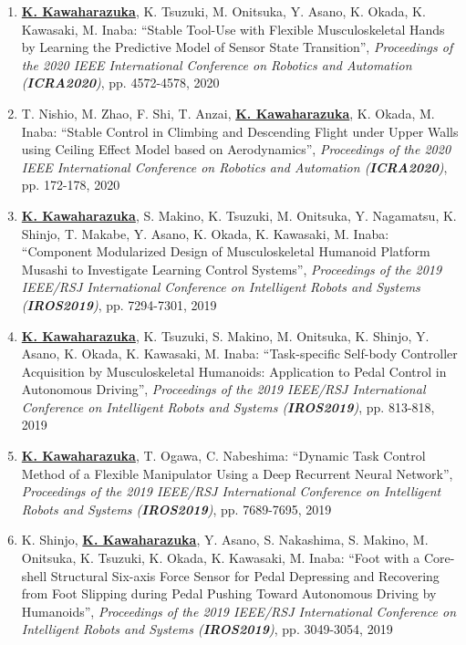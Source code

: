 \documentclass[letterpaper]{article}
\begin{document}
\begin{enumerate}
\item \underline{\textbf{K. Kawaharazuka}}, K. Tsuzuki, M. Onitsuka, Y. Asano, K. Okada, K. Kawasaki, M. Inaba: ``Stable Tool-Use with Flexible Musculoskeletal Hands by Learning the Predictive Model of Sensor State Transition'', \textit{Proceedings of the 2020 IEEE International Conference on Robotics and Automation (\textit{\textbf{ICRA2020}})}, pp. 4572-4578, 2020
\item T. Nishio, M. Zhao, F. Shi, T. Anzai, \underline{\textbf{K. Kawaharazuka}}, K. Okada, M. Inaba: ``Stable Control in Climbing and Descending Flight under Upper Walls using Ceiling Effect Model based on Aerodynamics'', \textit{Proceedings of the 2020 IEEE International Conference on Robotics and Automation (\textit{\textbf{ICRA2020}})}, pp. 172-178, 2020
\item \underline{\textbf{K. Kawaharazuka}}, S. Makino, K. Tsuzuki, M. Onitsuka, Y. Nagamatsu, K. Shinjo, T. Makabe, Y. Asano, K. Okada, K. Kawasaki, M. Inaba: ``Component Modularized Design of Musculoskeletal Humanoid Platform Musashi to Investigate Learning Control Systems'', \textit{Proceedings of the 2019 IEEE/RSJ International Conference on Intelligent Robots and Systems (\textit{\textbf{IROS2019}})}, pp. 7294-7301, 2019
\item \underline{\textbf{K. Kawaharazuka}}, K. Tsuzuki, S. Makino, M. Onitsuka, K. Shinjo, Y. Asano, K. Okada, K. Kawasaki, M. Inaba: ``Task-specific Self-body Controller Acquisition by Musculoskeletal Humanoids: Application to Pedal Control in Autonomous Driving'', \textit{Proceedings of the 2019 IEEE/RSJ International Conference on Intelligent Robots and Systems (\textit{\textbf{IROS2019}})}, pp. 813-818, 2019
\item \underline{\textbf{K. Kawaharazuka}}, T. Ogawa, C. Nabeshima: ``Dynamic Task Control Method of a Flexible Manipulator Using a Deep Recurrent Neural Network'', \textit{Proceedings of the 2019 IEEE/RSJ International Conference on Intelligent Robots and Systems (\textit{\textbf{IROS2019}})}, pp. 7689-7695, 2019
\item K. Shinjo, \underline{\textbf{K. Kawaharazuka}}, Y. Asano, S. Nakashima, S. Makino, M. Onitsuka, K. Tsuzuki, K. Okada, K. Kawasaki, M. Inaba: ``Foot with a Core-shell Structural Six-axis Force Sensor for Pedal Depressing and Recovering from Foot Slipping during Pedal Pushing Toward Autonomous Driving by Humanoids'', \textit{Proceedings of the 2019 IEEE/RSJ International Conference on Intelligent Robots and Systems (\textit{\textbf{IROS2019}})}, pp. 3049-3054, 2019

\end{enumerate}
\end{document}
